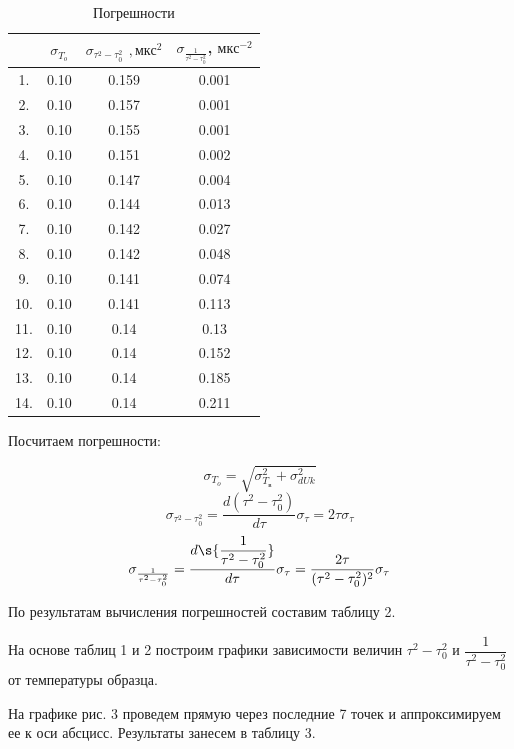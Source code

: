 \documentclass[12pt]{kiarticle} %
\begin{document}
\begin{table}
	\caption{Погрешности}
	\begin{tabular}{|c|c|c|c|}
		\hline
		\text{№} & $ \sigma_{T_o}  $ & $  \sigma_{\tau^2 - \tau_0^2} $ $,  мкс^{2}  $ &  $ \sigma_{\frac{1}{\tau^2 - \tau_0^2}} $, $ мкс^{-2}  $ \\
		\hline
		1. & 0.10 & 0.159 & 0.001 \\
		2. & 0.10 & 0.157 & 0.001 \\
		3. & 0.10 & 0.155 & 0.001 \\
		4. & 0.10 & 0.151 & 0.002 \\
		5. & 0.10 & 0.147 & 0.004 \\
		6. & 0.10 & 0.144 & 0.013 \\
		7. & 0.10 & 0.142 & 0.027 \\
		8. & 0.10 & 0.142 & 0.048 \\
		9. & 0.10 & 0.141 & 0.074 \\
		10. & 0.10 & 0.141 & 0.113 \\
		11. & 0.10 & 0.14 & 0.13 \\
		12. & 0.10 & 0.14 & 0.152 \\
		13. & 0.10 & 0.14 & 0.185 \\
		14. & 0.10 & 0.14 & 0.211 \\
		\hline
	\end{tabular}
\end{table}
Посчитаем погрешности: 

$$
\sigma_{T_o} = \sqrt{\sigma_{T_в}^2 + \sigma_{dUk}^2}
$$
\begin{equation}\label{}
\sigma_{\tau^2 - \tau_0^2} = \dfrac{d(\tau^2 - \tau_0^2)}{d\tau}\sigma_\tau = 2\tau\sigma_\tau
\end{equation}
\begin{equation}\label{}
\sigma_{\frac{1}{\tau^2 - \tau_0^2}} = \dfrac{d\s{\dfrac{1}{\tau^2 - \tau_0^2}}}{d\tau}\sigma_\tau = \dfrac{2\tau}{{(\tau^2 - \tau_0^2)^2}}\sigma_\tau
\end{equation}

По результатам вычисления погрешностей составим таблицу 2.

На основе таблиц 1 и 2 построим графики зависимости величин $ \tau^2 - \tau_0^2 $ и $ \dfrac{1}{\tau^2 - \tau_0^2} $ от температуры образца.
\par
На графике рис. 3 проведем прямую через последние 7 точек и аппроксимируем ее к оси абсцисс. Результаты занесем в таблицу 3.
\end{document}
